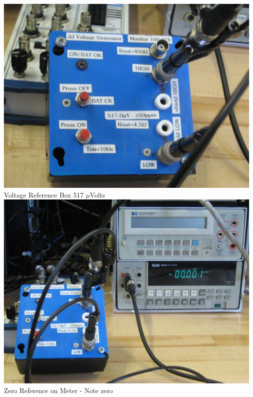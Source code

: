 \documentclass{../lab}
\begin{document}
\noindent
\begin{minipage}[t]{0.5\linewidth}
    \centering
    \href{http://experimentationlab.berkeley.edu/sites/default/files/JOS/Voltage-Ref_4058.JPG}{\includegraphics[width=0.97\linewidth,keepaspectratio]{images/Voltage-Ref_4058.JPG}} \\
    Voltage Reference Box 517 $\mu$Volts \\\vspace{1em}
    \href{http://experimentationlab.berkeley.edu/sites/default/files/JOS/V-Ref-Setup-0_4060.JPG}{\includegraphics[width=0.97\linewidth,keepaspectratio]{images/V-Ref-Setup-0_4060.JPG}} \\
    Zero Reference on Meter - Note zero
\end{minipage}
\end{document}
